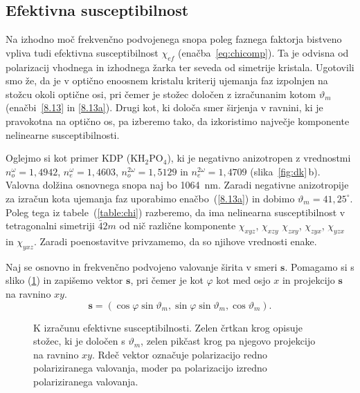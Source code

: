 \subsection*{Efektivna susceptibilnost}
Na izhodno moč frekvenčno podvojenega snopa poleg faznega faktorja bistveno vpliva tudi efektivna 
susceptibilnost $\chi_{ef}$ (enačba~\ref{eq:chicomp}). Ta je odvisna 
od polarizacij vhodnega in izhodnega žarka ter seveda od simetrije kristala. Ugotovili smo že, 
da je v optično enoosnem kristalu kriterij ujemanja faz izpolnjen na stožcu okoli 
optične osi, pri čemer je stožec določen 
z izračunanim kotom $\vartheta_m$ (enačbi~\ref{8.13} in \ref{8.13a}). 
Drugi kot, ki določa smer širjenja v ravnini, ki je pravokotna na optično os, pa 
izberemo tako, da izkoristimo največje komponente nelinearne 
susceptibilnosti. 

Oglejmo si kot primer KDP (KH$_{2}$PO$_{4}$), ki je negativno anizotropen 
z vrednostmi $n_o^{\omega} = 1,4942$, 
$n_e^{\omega} = 1,4603$, $n_o^{2\omega} = 1,5129$ in $n_e^{2\omega} = 1,4709$
(slika~\ref{fig:dk}\,b). Valovna dolžina osnovnega snopa naj bo 1064~nm. 
Zaradi negativne anizotropije za izračun kota ujemanja faz 
uporabimo enačbo~(\ref{8.13a}) in dobimo $\vartheta_m = 41,25^\circ$. 
Poleg tega iz tabele~(\ref{table:chi}) razberemo, da ima nelinearna susceptibilnost v tetragonalni
simetriji $\bar{4}2m$ od nič različne komponente $\chi_{xyz}$, $\chi_{xzy}$
$\chi_{zxy}$, $\chi_{zyx}$, $\chi_{yzx}$ in $\chi_{yxz}$.
Zaradi poenostavitve privzamemo, da so njihove vrednosti enake. 

Naj se osnovno in frekvenčno podvojeno valovanje širita 
v smeri $\mathbf{s}$. Pomagamo si s sliko (\ref{fig:chi}) in zapišemo 
vektor $\mathbf{s}$, pri čemer je kot $\varphi$ kot med osjo $x$ in projekcijo 
$\mathbf{s}$ na ravnino $xy$. 
\begin{equation}
\mathbf{s}=(\cos\varphi\sin\vartheta_m,\sin\varphi\sin\vartheta_m,\cos\vartheta_m).
\label{8.14}
\end{equation}

\begin{figure}[h]
\centering
\def\svgwidth{80truemm} 

\caption{K izračunu efektivne susceptibilnosti. Zelen črtkan krog opisuje 
stožec, ki je določen s $\vartheta_m$, zelen pikčast krog pa njegovo projekcijo
na ravnino $xy$. Rdeč vektor označuje
polarizacijo redno polariziranega valovanja, moder pa polarizacijo izredno polariziranega valovanja.}
\label{fig:chi}
\end{figure}

